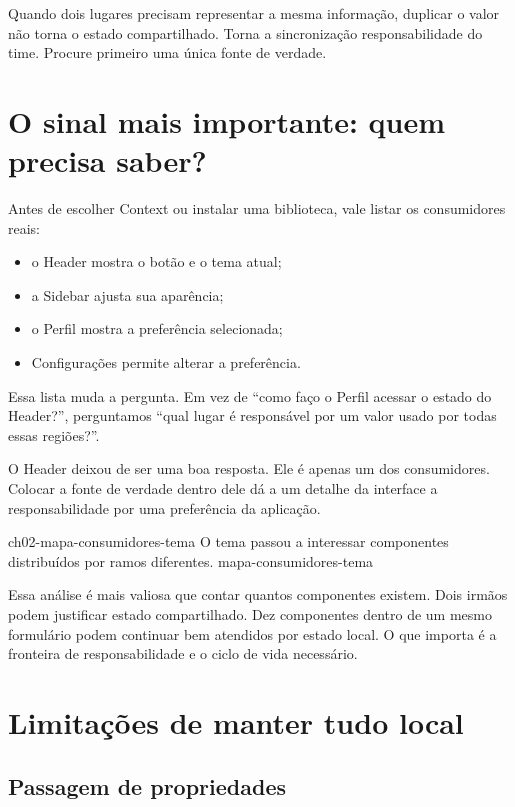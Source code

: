 \begin{decisao}
Quando dois lugares precisam representar a mesma informação, duplicar o valor
não torna o estado compartilhado. Torna a sincronização responsabilidade do
time. Procure primeiro uma única fonte de verdade.
\end{decisao}

\section{O sinal mais importante: quem precisa saber?}

Antes de escolher Context ou instalar uma biblioteca, vale listar os
consumidores reais:

\begin{itemize}
  \item o Header mostra o botão e o tema atual;
  \item a Sidebar ajusta sua aparência;
  \item o Perfil mostra a preferência selecionada;
  \item Configurações permite alterar a preferência.
\end{itemize}

Essa lista muda a pergunta. Em vez de ``como faço o Perfil acessar o estado do
Header?'', perguntamos ``qual lugar é responsável por um valor usado por todas
essas regiões?''.

O Header deixou de ser uma boa resposta. Ele é apenas um dos consumidores.
Colocar a fonte de verdade dentro dele dá a um detalhe da interface a
responsabilidade por uma preferência da aplicação.

\imagemcapitulo
  {ch02-mapa-consumidores-tema}
  {O tema passou a interessar componentes distribuídos por ramos diferentes.}
  {mapa-consumidores-tema}

Essa análise é mais valiosa que contar quantos componentes existem. Dois irmãos
podem justificar estado compartilhado. Dez componentes dentro de um mesmo
formulário podem continuar bem atendidos por estado local. O que importa é a
fronteira de responsabilidade e o ciclo de vida necessário.

\section{Limitações de manter tudo local}

\subsection{Passagem de propriedades}

